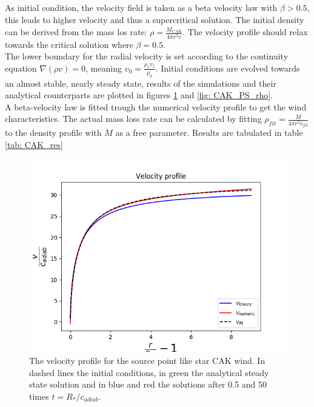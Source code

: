 As initial condition, the velocity field is taken as a beta velocity law with $\beta > 0.5$, this leads to higher velocity and thus a supercritical solution. The initial density can be derived from the mass los rate: $\rho = \frac{\dot{M}_{CAK}}{4\pi r^2 v}$. The velocity profile should relax towards the critical solution where $\beta = 0.5$.\\

The lower boundary for the radial velocity is set according to the continuity equation $\nabla (\rho v) = 0$, meaning $v_0 = \frac{\rho_1 v_1}{\rho_0}$. Initial conditions are evolved towards an almost stable, nearly steady state, results of the simulations and their analytical counterparts are plotted in figures \ref{fig: CAK_PS_v} and \ref{fig: CAK_PS_rho}.\\

A beta-velocity law is fitted trough the numerical velocity profile to get the wind characteristics. The actual mass loss rate can be calculated by fitting $\rho_{fit} = \frac{\dot{M}}{4\pi r^2 v_{fit}}$ to the density profile with $\dot{M}$ as a free parameter. Results are tabulated in table \ref{tab: CAK_res}

\begin{figure}
\centering
\includegraphics[width = \textwidth]{CAK_velocity_profile.png}
\caption{The velocity profile for the source point like star CAK wind. In dashed lines the initial conditions, in green the analytical steady state solution and in blue and red the solutions after 0.5 and 50 times $t = R_*/c_{adiab}$.}
\label{fig: CAK_PS_v}
\end{figure}

